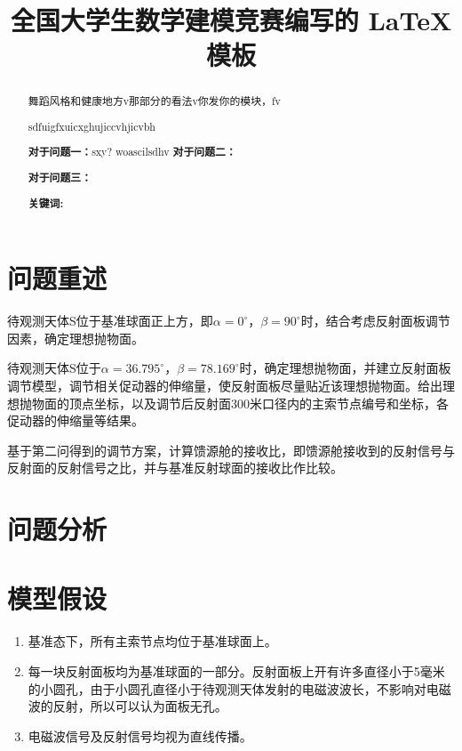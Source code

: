 \documentclass[withoutpreface,bwprint]{cumcmthesis} %
\title{全国大学生数学建模竞赛编写的 \LaTeX{} 模板}
\begin{document}
\maketitle
\begin{abstract}



舞蹈风格和健康地方v那部分的看法v你发你的模块，fv


sdfuigfxuicxghujiccvhjicvbh

\textbf{对于问题一：}sxy?
woascilsdhv
\textbf{对于问题二：}

\textbf{对于问题三：}

\textbf{关键词:}
\end{abstract}



\section{问题重述}

 \begin{problem}
待观测天体S位于基准球面正上方，即$\alpha=0^{\circ}$，$\beta=90^{\circ}$时，结合考虑反射面板调节因素，确定理想抛物面。
 \end{problem}
 \begin{problem}
待观测天体S位于$\alpha=36.795^{\circ}$，$\beta=78.169^{\circ}$时，确定理想抛物面，并建立反射面板调节模型，调节相关促动器的伸缩量，使反射面板尽量贴近该理想抛物面。给出理想抛物面的顶点坐标，以及调节后反射面300米口径内的主索节点编号和坐标，各促动器的伸缩量等结果。
 \end{problem}
 \begin{problem}
基于第二问得到的调节方案，计算馈源舱的接收比，即馈源舱接收到的反射信号与反射面的反射信号之比，并与基准反射球面的接收比作比较。
\end{problem}

\section{问题分析}

\section{模型假设}
\begin{enumerate}
    \item 基准态下，所有主索节点均位于基准球面上。
    \item 每一块反射面板均为基准球面的一部分。反射面板上开有许多直径小于5毫米的小圆孔，由于小圆孔直径小于待观测天体发射的电磁波波长，不影响对电磁波的反射，所以可以认为面板无孔。
    \item 电磁波信号及反射信号均视为直线传播。
\end{enumerate}
\end{document}
